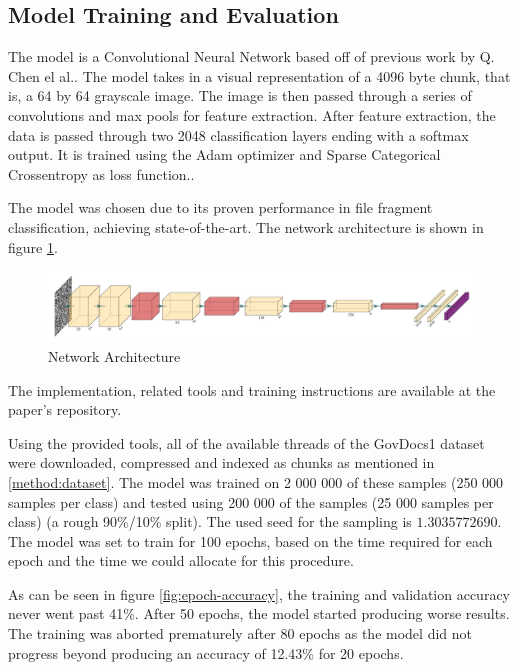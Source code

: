 \documentclass[conference]{IEEEtran}
\begin{document}
\subsection{Model Training and Evaluation}
\label{result:model}

The model is a Convolutional Neural Network based off of previous work by Q. Chen el al.. The model takes in a visual representation of a 4096 byte chunk, that is, a 64 by 64 grayscale image. The image is then passed through a series of convolutions and max pools for feature extraction. After feature extraction, the data is passed through two 2048 classification layers ending with a softmax output. It is trained using the Adam optimizer and Sparse Categorical Crossentropy as loss function.\cite{chen2018}.

The model was chosen due to its proven performance in file fragment classification, achieving state-of-the-art\cite{chen2018}. The network architecture is shown in figure \ref{fig:cnn}.

\begin{figure}
    \centering
    \includegraphics[scale=0.45]{model.pdf}
    \caption{Network Architecture}
    \label{fig:cnn}
\end{figure}

The implementation, related tools and training instructions are available at the paper's repository.

Using the provided tools, all of the available threads of the GovDocs1 dataset were downloaded, compressed and indexed as chunks as mentioned in \ref{method:dataset}. The model was trained on 2 000 000 of these samples (250 000 samples per class) and tested using 200 000 of the samples (25 000 samples per class) (a rough 90\%/10\% split). The used seed for the sampling is $1.3035772690$. The model was set to train for 100 epochs, based on the time required for each epoch and the time we could allocate for this procedure.

As can be seen in figure \ref{fig:epoch-accuracy}, the training and validation accuracy never went past 41\%. After 50 epochs, the model started producing worse results. The training was aborted prematurely after 80 epochs as the model did not progress beyond producing an accuracy of 12.43\% for 20 epochs.
\end{document}
